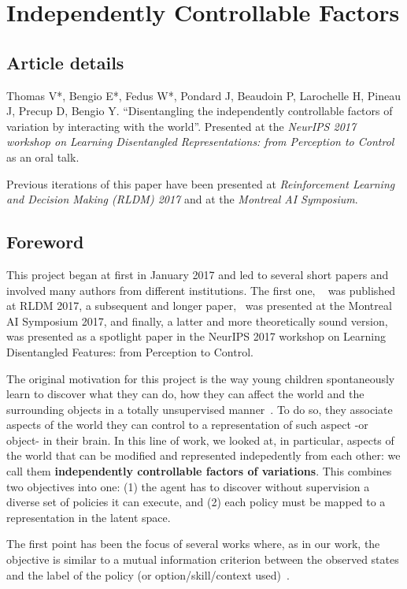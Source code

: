 \chapter{Independently Controllable Factors}
\label{chapter:icf}
\section*{Article details}
Thomas V*, Bengio E*, Fedus W*, Pondard J, Beaudoin P, Larochelle H, Pineau J, Precup D, Bengio Y. ``Disentangling the independently controllable factors of variation by interacting with the world''. Presented at the \emph{ NeurIPS 2017 workshop on Learning Disentangled Representations: from Perception to Control} as an oral talk. 

Previous iterations of this paper have been presented at \emph{Reinforcement Learning and Decision Making (RLDM) 2017} and at the \emph{Montreal AI Symposium}.

\section*{Foreword}
This project began at first in January 2017 and led to several short papers and involved many authors from different institutions. The first one, ~\citet{bengio2017independently} was published at RLDM 2017, a subsequent and longer paper,~\citet{thomas2017independently} was presented at the Montreal AI Symposium 2017, and finally, a latter and more theoretically sound version, \citet{thomas2018disentangling} was presented as a spotlight paper in the NeurIPS 2017 workshop on Learning Disentangled Features: from Perception to Control.

The original motivation for this project is the way young children spontaneously learn to discover what they can do, how they can affect the world and the surrounding objects in a totally unsupervised manner~\citep{berlyne1966curiosity, gopnik1999scientist}. To do so, they associate aspects of the world they can control to a representation of such aspect -or object- in their brain. In this line of work, we looked at, in particular, aspects of the world that can be modified and represented indepedently from each other: we call them \textbf{independently controllable factors of variations}. This combines two objectives into one: (1) the agent has to discover without supervision a diverse set of policies it can execute, and (2) each policy must be mapped to a representation in the latent space.

The first point has been the focus of several works where, as in our work, the objective is similar to a mutual information criterion between the observed states and the label of the policy (or option/skill/context used)~\citep{still2012information, mohamed2015variational, gregor2016variational, florensa2017stochastic, eysenbach2018diversity, achiam2018variational}.

